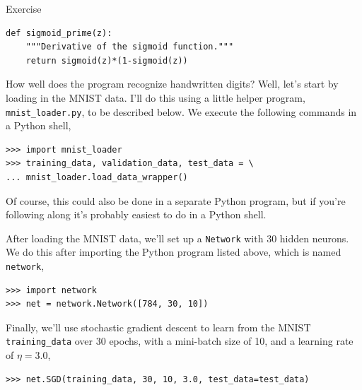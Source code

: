 \begin{exerciseBox}{Exercise}
\begin{lstlisting}
def sigmoid_prime(z):
    """Derivative of the sigmoid function."""
    return sigmoid(z)*(1-sigmoid(z))

\end{lstlisting}


How well does the program recognize handwritten digits? Well, let's start by loading in the MNIST data. I'll do this using a little helper program, \texttt{mnist\_\allowbreak{}loader.py}, to be described below. We execute the following commands in a Python shell,



\begin{lstlisting}
>>> import mnist_loader
>>> training_data, validation_data, test_data = \
... mnist_loader.load_data_wrapper()

\end{lstlisting}


Of course, this could also be done in a separate Python program, but if you're following along it's probably easiest to do in a Python shell.


After loading the MNIST data, we'll set up a \texttt{Network} with $30$ hidden neurons. We do this after importing the Python program listed above, which is named \texttt{network},



\begin{lstlisting}
>>> import network
>>> net = network.Network([784, 30, 10])

\end{lstlisting}


Finally, we'll use stochastic gradient descent to learn from the MNIST \texttt{training\_\allowbreak{}data} over 30 epochs, with a mini-batch size of 10, and a learning rate of $\eta = 3.0$,



\begin{lstlisting}
>>> net.SGD(training_data, 30, 10, 3.0, test_data=test_data)

\end{lstlisting}



\end{exerciseBox}
